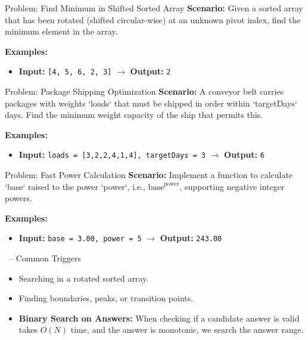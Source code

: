 \begin{frame}[fragile]{Problem: Find Minimum in Shifted Sorted Array}
  \textbf{Scenario:}
  Given a sorted array that has been rotated (shifted circular-wise) at an unknown pivot index, find the minimum element in the array.
  
  \vspace{0.3cm}
  \textbf{Examples:}
  \begin{itemize}
    \item \textbf{Input:} \texttt{[4, 5, 6, 2, 3]} $\rightarrow$ \textbf{Output:} \texttt{2}
  \end{itemize}
\end{frame}

\begin{frame}[fragile]{Problem: Package Shipping Optimization}
  \textbf{Scenario:}
  A conveyor belt carries packages with weights `loads` that must be shipped in order within `targetDays` days. Find the minimum weight capacity of the ship that permits this.
  
  \vspace{0.3cm}
  \textbf{Examples:}
  \begin{itemize}
    \item \textbf{Input:} \texttt{loads = [3,2,2,4,1,4], targetDays = 3} $\rightarrow$ \textbf{Output:} \texttt{6}
  \end{itemize}
\end{frame}

\begin{frame}[fragile]{Problem: Fast Power Calculation}
  \textbf{Scenario:}
  Implement a function to calculate `base` raised to the power `power`, i.e., $\text{base}^{\text{power}}$, supporting negative integer powers.
  
  \vspace{0.3cm}
  \textbf{Examples:}
  \begin{itemize}
    \item \textbf{Input:} \texttt{base = 3.00, power = 5} $\rightarrow$ \textbf{Output:} \texttt{243.00}
  \end{itemize}
\end{frame}

\begin{frame}{\secname\ -- Common Triggers}
  \begin{itemize}
    \item Searching in a rotated sorted array.
        \item Finding boundaries, peaks, or transition points.
        \item \textbf{Binary Search on Answers:} When checking if a candidate answer is valid takes $O(N)$ time, and the answer is monotonic, we search the answer range.
  \end{itemize}
\end{frame}
